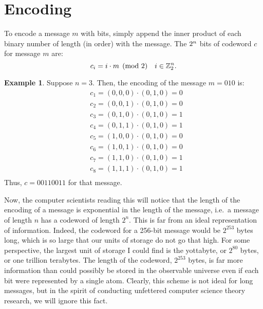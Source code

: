 \documentclass[12pt,twoside]{reedthesis}
\theoremstyle{definition}
\newtheorem{example}[theorem]{Example}
\newcommand{\Z}{\mathbb{Z}}
\begin{document}
\section{Encoding}
To encode a message $m$ with \mlen bits, simply append the inner product of each binary number of length \mlen (in order) with the message. The $2^n$ bits of codeword $c$ for message $m$ are: 
\begin{equation*}
c_i= i \cdot m \pmod{2} \quad{i \in \Z_2^\mlen}.
\end{equation*}
\begin{example}
Suppose $n=3$. Then, the encoding of the message $m = 010$ is:
\begin{align*}
&c_1 = (0,0,0) \cdot (0,1,0) = 0\\
&c_2 = (0,0,1) \cdot (0,1,0) = 0\\
&c_3 = (0,1,0) \cdot (0,1,0) = 1\\
&c_4 = (0,1,1) \cdot (0,1,0) = 1\\
&c_5 = (1,0,0) \cdot (0,1,0) = 0\\
&c_6 = (1,0,1) \cdot (0,1,0) = 0\\
&c_7 = (1,1,0) \cdot (0,1,0) = 1\\
&c_8 = (1,1,1) \cdot (0,1,0) = 1\\
\end{align*}
Thus, $c = 00110011$ for that message. 
\end{example}
Now, the computer scientists reading this will notice that the length of the encoding of a message is exponential in the length of the message, i.e.~a message of length $n$ has a codeword of length $2^n$. This is far from an ideal representation of information. Indeed, the codeword for a 256-bit message would be $2^{253}$ bytes long, which is so large that our units of storage do not go that high. For some perspective, the largest unit of storage I could find is the yottabyte, or $2^{80}$ bytes, or one trillion terabytes. The length of the codeword, $2^{253}$ bytes, is far more information than could possibly be stored in the observable universe even if each bit were represented by a single atom. Clearly, this scheme is not ideal for long messages, but in the spirit of conducting unfettered computer science theory research, we will ignore this fact. 
\end{document}
